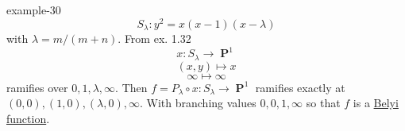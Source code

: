 \documentclass[10pt,]{book}
\numberwithin{equation}{section}
\DeclareMathOperator{\PP}{\mathbf{P}}
\begin{document}
\begin{example}{}{example-30}%
\hypertarget{p-602}{}%
%
\begin{equation*}
S_\lambda : y^2 = x(x-1)(x-\lambda)
\end{equation*}
with \(\lambda = m/(m+n)\). From ex. 1.32%
\begin{equation*}
x\colon S_\lambda \to \PP^1
\end{equation*}
%
\begin{equation*}
(x,y) \mapsto x
\end{equation*}
%
\begin{equation*}
\infty \mapsto \infty
\end{equation*}
ramifies over \(0,1,\lambda,\infty\). Then \(f = P_\lambda \circ x \colon S_\lambda \to \PP^1\) ramifies exactly at \((0,0), (1,0), (\lambda,0), \infty\). With branching values \(0,0,1,\infty\) so that \(f\) is a \hyperref[def-belyi-function]{Belyi function}.%
\end{example}
%
%
\typeout{************************************************}
\typeout{************************************************}
%
\end{document}
